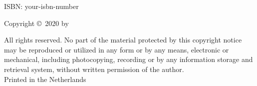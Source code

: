 \begin{small}
\noindent ISBN: your-isbn-number\\
\smallskip{}

\noindent Copyright \copyright~2020 by \theauthor\\
\smallskip{}

\noindent All rights reserved. No part of the material protected by this copyright notice may be reproduced or utilized in any form or by any means, electronic or mechanical, including photocopying, recording or by any information storage and retrieval system, without written permission of the author.
\\

\noindent Printed in the Netherlands

\end{small}

